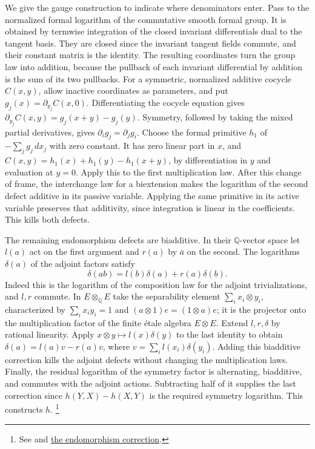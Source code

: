 We give the gauge construction to indicate where denominators enter.
Pass to the normalized formal logarithm of the commutative smooth
formal group. It is obtained by termwise integration of the
closed invariant differentials dual to the tangent basis. They are
closed since the invariant tangent fields commute, and their
constant matrix is the identity. The resulting coordinates turn
the group law into addition, because the pullback of each invariant
differential by addition is the sum of its two pullbacks. For a
symmetric, normalized additive cocycle \(C(x,y)\), allow inactive
coordinates as parameters, and put
\(g_j(x)=\partial_{y_j} C(x,0)\). Differentiating the cocycle equation
gives \(\partial_{y_j}C(x,y)=g_j(x+y)-g_j(y)\).
Symmetry, followed by taking the mixed partial derivatives, gives
\(\partial_i g_j=\partial_j g_i\). Choose the formal primitive \(h_1\)
of \(-\sum_jg_j\,dx_j\) with zero constant. It has zero linear part
in \(x\), and
\(C(x,y)=h_1(x)+h_1(y)-h_1(x+y)\), by differentiation in \(y\)
and evaluation at \(y=0\). Apply this to the first multiplication
law. After this change of frame, the interchange law for a
biextension makes the logarithm of the second defect additive in
its passive variable. Applying the same primitive in its active
variable preserves that additivity, since integration is linear in
the coefficients. This kills both defects.

The remaining endomorphism defects are biadditive. In their
\(\mathbb Q\)-vector space let \(l(a)\) act on the first argument
and \(r(a)\) by \(\bar a\) on the second. The logarithms \(\delta(a)\)
of the adjoint factors satisfy
\[
  \delta(ab)=l(b)\delta(a)+r(a)\delta(b).
\]
Indeed this is the logarithm of the composition law for the adjoint
trivializations, and \(l,r\) commute. In \(E\otimes_\mathbb Q E\)
take the separability element \(\sum_i x_i\otimes y_i\), characterized
by \(\sum_i x_i y_i=1\) and
\((a\otimes1)e=(1\otimes a)e\); it is the projector onto the
multiplication factor of the finite étale algebra \(E\otimes E\).
Extend \(l,r,\delta\) by rational linearity. Apply
\(x\otimes y\mapsto l(x)\delta(y)\) to the last identity to obtain
\(\delta(a)=l(a)v-r(a)v\), where \(v=\sum_i l(x_i)\delta(y_i)\).
Adding this biadditive correction kills the adjoint defects without
changing the multiplication laws. Finally, the residual logarithm
of the symmetry factor is alternating, biadditive, and commutes
with the adjoint actions. Subtracting half of it supplies the
last correction since \(h(Y,X)-h(X,Y)\) is the required symmetry
logarithm. This constructs \(h\).
\footnote{See \href{https://github.com/ChristianKudeba/alpoge-rh-verification/blob/alpoge-source-7cbf7a0c/src/Development/AbelianVarietyTheory/Proofs/FormalGroupCharts/CanonGaugeOfLog.lean}{} and
\href{https://github.com/ChristianKudeba/alpoge-rh-verification/blob/alpoge-source-7cbf7a0c/src/Development/AbelianVarietyTheory/Proofs/FormalGroupCharts/DerivationInnerOfSeparabilityElement.lean}{the endomorphism correction}.}


